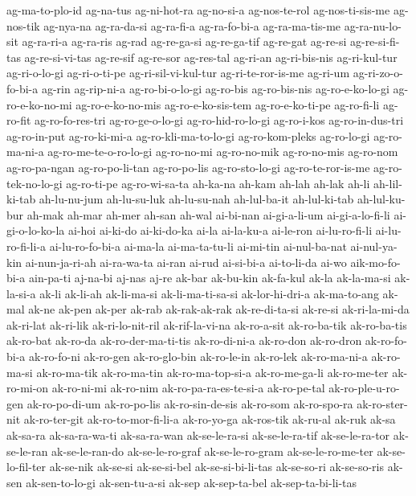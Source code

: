 {ag-ma-to-plo-id ag-na-tus ag-ni-hot-ra ag-no-si-a ag-nos-te-rol
ag-nos-ti-sis-me ag-nos-tik ag-nya-na ag-ra-da-si ag-ra-fi-a ag-ra-fo-bi-a
ag-ra-ma-tis-me ag-ra-nu-lo-sit ag-ra-ri-a ag-ra-ris ag-rad ag-re-ga-si
ag-re-ga-tif ag-re-gat ag-re-si ag-re-si-fi-tas ag-re-si-vi-tas ag-re-sif
ag-re-sor ag-res-tal ag-ri-an ag-ri-bis-nis ag-ri-kul-tur ag-ri-o-lo-gi
ag-ri-o-ti-pe ag-ri-sil-vi-kul-tur ag-ri-te-ror-is-me ag-ri-um
ag-ri-zo-o-fo-bi-a ag-rin ag-rip-ni-a ag-ro-bi-o-lo-gi ag-ro-bis
ag-ro-bis-nis ag-ro-e-ko-lo-gi ag-ro-e-ko-no-mi ag-ro-e-ko-no-mis
ag-ro-e-ko-sis-tem ag-ro-e-ko-ti-pe ag-ro-fi-li ag-ro-fit ag-ro-fo-res-tri
ag-ro-ge-o-lo-gi ag-ro-hid-ro-lo-gi ag-ro-i-kos ag-ro-in-dus-tri
ag-ro-in-put ag-ro-ki-mi-a ag-ro-kli-ma-to-lo-gi ag-ro-kom-pleks
ag-ro-lo-gi ag-ro-ma-ni-a ag-ro-me-te-o-ro-lo-gi ag-ro-no-mi ag-ro-no-mik
ag-ro-no-mis ag-ro-nom ag-ro-pa-ngan ag-ro-po-li-tan ag-ro-po-lis
ag-ro-sto-lo-gi ag-ro-te-ror-is-me ag-ro-tek-no-lo-gi ag-ro-ti-pe
ag-ro-wi-sa-ta ah-ka-na ah-kam ah-lah ah-lak ah-li ah-lil-ki-tab
ah-lu-nu-jum ah-lu-su-luk ah-lu-su-nah ah-lul-ba-it ah-lul-ki-tab
ah-lul-ku-bur ah-mak ah-mar ah-mer ah-san ah-wal ai-bi-nan ai-gi-a-li-um
ai-gi-a-lo-fi-li ai-gi-o-lo-ko-la ai-hoi ai-ki-do ai-ki-do-ka ai-la
ai-la-ku-a ai-le-ron ai-lu-ro-fi-li ai-lu-ro-fi-li-a ai-lu-ro-fo-bi-a
ai-ma-la ai-ma-ta-tu-li ai-mi-tin ai-nul-ba-nat ai-nul-ya-kin
ai-nun-ja-ri-ah ai-ra-wa-ta ai-ran ai-rud ai-si-bi-a ai-to-li-da ai-wo
aik-mo-fo-bi-a ain-pa-ti aj-na-bi aj-nas aj-re ak-bar ak-bu-kin ak-fa-kul
ak-la ak-la-ma-si ak-la-si-a ak-li ak-li-ah ak-li-ma-si ak-li-ma-ti-sa-si
ak-lor-hi-dri-a ak-ma-to-ang ak-mal ak-ne ak-pen ak-per ak-rab
ak-rak-ak-rak ak-re-di-ta-si ak-re-si ak-ri-la-mi-da ak-ri-lat ak-ri-lik
ak-ri-lo-nit-ril ak-rif-la-vi-na ak-ro-a-sit ak-ro-ba-tik ak-ro-ba-tis
ak-ro-bat ak-ro-da ak-ro-der-ma-ti-tis ak-ro-di-ni-a ak-ro-don ak-ro-dron
ak-ro-fo-bi-a ak-ro-fo-ni ak-ro-gen ak-ro-glo-bin ak-ro-le-in ak-ro-lek
ak-ro-ma-ni-a ak-ro-ma-si ak-ro-ma-tik ak-ro-ma-tin ak-ro-ma-top-si-a
ak-ro-me-ga-li ak-ro-me-ter ak-ro-mi-on ak-ro-ni-mi ak-ro-nim
ak-ro-pa-ra-es-te-si-a ak-ro-pe-tal ak-ro-ple-u-ro-gen ak-ro-po-di-um
ak-ro-po-lis ak-ro-sin-de-sis ak-ro-som ak-ro-spo-ra ak-ro-ster-nit
ak-ro-ter-git ak-ro-to-mor-fi-li-a ak-ro-yo-ga ak-ros-tik ak-ru-al ak-ruk
ak-sa ak-sa-ra ak-sa-ra-wa-ti ak-sa-ra-wan ak-se-le-ra-si ak-se-le-ra-tif
ak-se-le-ra-tor ak-se-le-ran ak-se-le-ran-do ak-se-le-ro-graf
ak-se-le-ro-gram ak-se-le-ro-me-ter ak-se-lo-fil-ter ak-se-nik ak-se-si
ak-se-si-bel ak-se-si-bi-li-tas ak-se-so-ri ak-se-so-ris ak-sen
ak-sen-to-lo-gi ak-sen-tu-a-si ak-sep ak-sep-ta-bel ak-sep-ta-bi-li-tas
}
